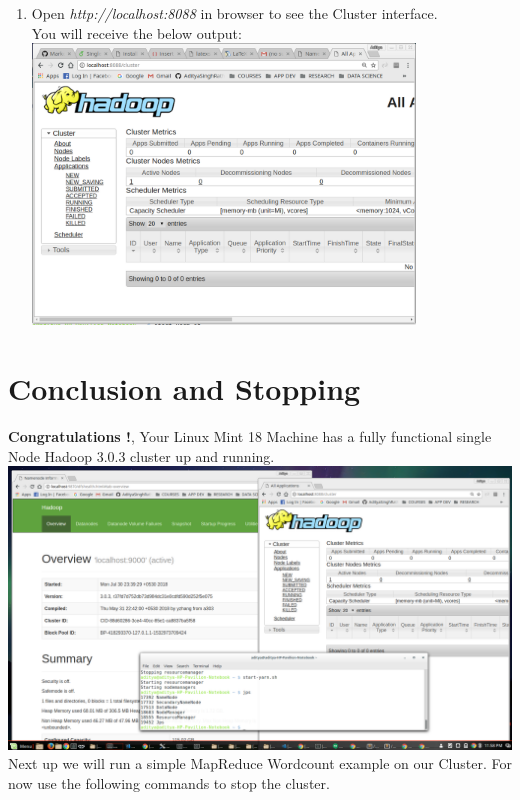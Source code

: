 \documentclass[12pt]{article}%
\begin{document}
\begin{enumerate}
\item Open \emph{http://localhost:8088} in browser to see the Cluster interface.\\
You will receive the below output:\\
\includegraphics[width=0.8\textwidth]{clusterrun.png}

\end{enumerate}

\section{Conclusion and Stopping}
\textbf{Congratulations !}, Your Linux Mint 18 Machine has a fully functional single Node Hadoop 3.0.3 cluster up and running.\\
\includegraphics[width=\textwidth]{conclu.png}
\\ Next up we will run a simple MapReduce Wordcount example on our Cluster. For now use the following commands to stop the cluster.                    
                       
\end{document}
